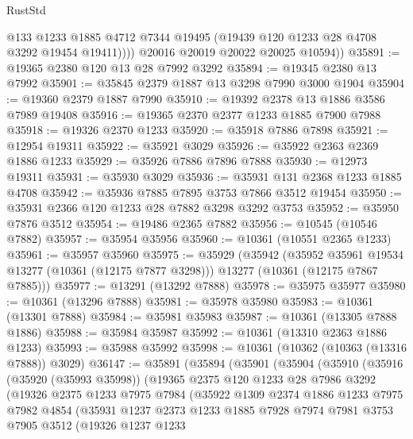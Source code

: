 \begin{lexlean}{RustStd}
\begin{coremodule}
              @133
              @1233
              @1885
              @4712
              @7344
              @19495
              (@19439 @120 @1233 @28 @4708 @3292 @19454 @19411))))
        @20016
        @20019
        @20022
        @20025
        @10594))
@35891 := @19365 @2380 @120 @13 @28 @7992 @3292
@35894 := @19345 @2380 @13 @7992
@35901 := @35845 @2379 @1887 @13 @3298 @7990 @3000 @1904
@35904 := @19360 @2379 @1887 @7990
@35910 := @19392 @2378 @13 @1886 @3586 @7989 @19408
@35916 := @19365 @2370 @2377 @1233 @1885 @7900 @7988
@35918 := @19326 @2370 @1233
@35920 := @35918 @7886 @7898
@35921 := @12954 @19311
@35922 := @35921 @3029
@35926 := @35922 @2363 @2369 @1886 @1233
@35929 := @35926 @7886 @7896 @7888
@35930 := @12973 @19311
@35931 := @35930 @3029
@35936 := @35931 @131 @2368 @1233 @1885 @4708
@35942 := @35936 @7885 @7895 @3753 @7866 @3512 @19454
@35950 := @35931 @2366 @120 @1233 @28 @7882 @3298 @3292 @3753
@35952 := @35950 @7876 @3512
@35954 := @19486 @2365 @7882
@35956 := @10545 (@10546 @7882)
@35957 := @35954 @35956
@35960 := @10361 (@10551 @2365 @1233)
@35961 := @35957 @35960
@35975 := @35929
    (@35942
      (@35952 @35961 @19534 @13277 (@10361 (@12175 @7877 @3298)))
      @13277
      (@10361 (@12175 @7867 @7885)))
@35977 := @13291 (@13292 @7888)
@35978 := @35975 @35977
@35980 := @10361 (@13296 @7888)
@35981 := @35978 @35980
@35983 := @10361 (@13301 @7888)
@35984 := @35981 @35983
@35987 := @10361 (@13305 @7888 @1886)
@35988 := @35984 @35987
@35992 := @10361 (@13310 @2363 @1886 @1233)
@35993 := @35988 @35992
@35998 := @10361 (@10362 (@10363 (@13316 @7888)) @3029)
@36147 := @35891
    (@35894
      (@35901
        (@35904
          (@35910
            (@35916
              (@35920 (@35993 @35998))
              (@19365
                @2375
                @120
                @1233
                @28
                @7986
                @3292
                (@19326
                  @2375
                  @1233
                  @7975
                  @7984
                  (@35922
                    @1309
                    @2374
                    @1886
                    @1233
                    @7975
                    @7982
                    @4854
                    (@35931
                      @1237
                      @2373
                      @1233
                      @1885
                      @7928
                      @7974
                      @7981
                      @3753
                      @7905
                      @3512
                      (@19326
                        @1237
                        @1233

\end{coremodule}
\end{lexlean}

